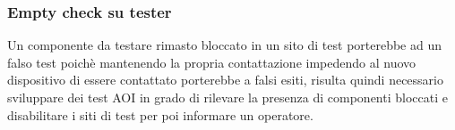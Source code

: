 \subsubsection{Empty check su tester}
Un componente da testare rimasto bloccato in un sito di test porterebbe ad un falso test poichè
mantenendo la propria contattazione impedendo al nuovo dispositivo di essere contattato porterebbe a
falsi esiti, risulta quindi necessario sviluppare dei test AOI in grado di rilevare la presenza di componenti
bloccati e disabilitare i siti di test per poi informare un operatore.

\endinput